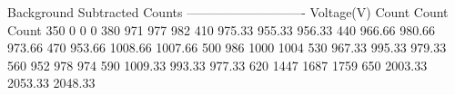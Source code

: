 Background Subtracted Counts
----------------------------
Voltage(V)	Count		Count 	Count
350		0		0		0
380		971		977		982
410		975.33		955.33		956.33
440		966.66		980.66		973.66
470		953.66		1008.66		1007.66
500		986		1000		1004
530		967.33		995.33		979.33
560		952		978		974
590		1009.33		993.33		977.33
620		1447		1687		1759
650		2003.33		2053.33		2048.33